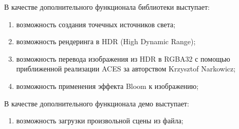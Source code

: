 В качестве дополнительного функционала библиотеки выступает:
\begin{enumerate}[resume]
    \item возможность создания точечных источников света;
    \item возможность рендеринга в HDR (High Dynamic Range);
    \item возможность перевода изображения из HDR в RGBA32 с помощью приближенной реализации ACES за авторством Krzysztof Narkowicz;
    \item возможность применения эффекта Bloom к изображению;
\end{enumerate}

В качестве дополнительного функционала демо выступает:
\begin{enumerate}[resume]
    \item возможность загрузки произвольной сцены из файла;
\end{enumerate}
